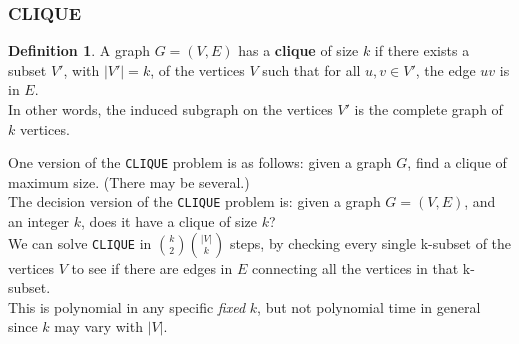 \documentclass[12pt]{article}
\theoremstyle{plain}
\theoremstyle{definition}
\newtheorem*{defn*}{Definition}
\begin{document}
\subsubsection{CLIQUE}
\begin{defn*}
A graph $G = (V, E)$ has a \textbf{clique} of size $k$ if there exists a subset $V'$, with $|V'| = k$, of the vertices $V$ such that for all $u, v \in V'$, the edge $uv$ is in $E$. \\
In other words, the induced subgraph on the vertices $V'$ is the complete graph of $k$ vertices.
\end{defn*}

One version of the \texttt{CLIQUE} problem is as follows: given a graph $G$, find a clique of maximum size. (There may be several.) \\

The decision version of the \texttt{CLIQUE} problem is: given a graph $G = (V, E)$, and an integer $k$, does it have a clique of size $k$? \\

We can solve \texttt{CLIQUE} in ${k \choose 2}{|V| \choose k}$ steps, by checking every single k-subset of the vertices $V$ to see if there are edges in $E$ connecting all the vertices in that k-subset. \\
This is polynomial in any specific \emph{fixed} $k$, but not polynomial time in general since $k$ may vary with $|V|$.
\end{document}
